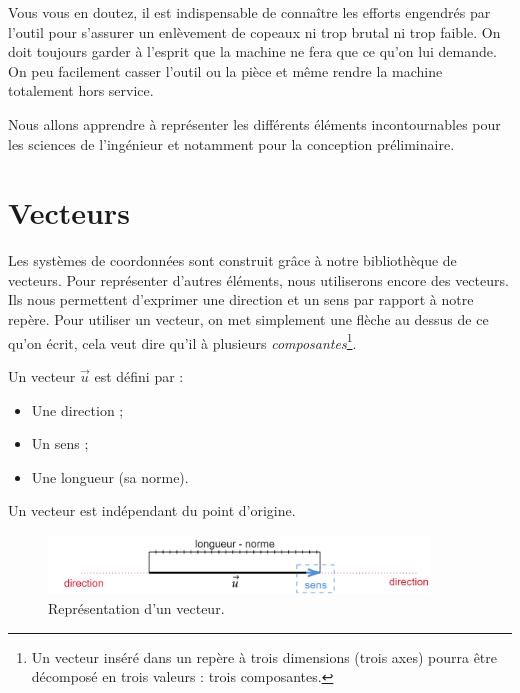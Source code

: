 \documentclass[
	11pt, %
	fleqn, %
	a4paper, %
]{LegrandOrangeBook}
\begin{document}
Vous vous en doutez, il est indispensable de connaître les efforts engendrés par l'outil pour s'assurer un enlèvement de copeaux ni trop brutal ni trop faible. On doit toujours garder à l'esprit que la machine ne fera que ce qu'on lui demande. On peu facilement casser l'outil ou la pièce et même rendre la machine totalement hors service.

Nous allons apprendre à représenter les différents éléments incontournables pour les sciences de l'ingénieur et notamment pour la conception préliminaire.







\section{Vecteurs}
Les systèmes de coordonnées sont construit grâce à notre bibliothèque de vecteurs. Pour représenter d'autres éléments, nous utiliserons encore des vecteurs. Ils nous permettent d'exprimer une direction et un sens par rapport à notre repère. Pour utiliser un vecteur, on met simplement une flèche au dessus de ce qu'on écrit, cela veut dire qu'il à plusieurs \textit{composantes}\footnote{Un vecteur inséré dans un repère à trois dimensions (trois axes) pourra être décomposé en trois valeurs : trois composantes.}.\\

\begin{definition}\label{Vecteurs}
    Un vecteur $\Vec{u}$ est défini par :
    \begin{itemize}
        \item Une direction ;
        \item Un sens ;
        \item Une longueur (sa norme).
    \end{itemize}
Un vecteur est indépendant du point d’origine.

\begin{figure}[H] %
	\centering %
	\includegraphics[width=0.9\textwidth]{Images/reel2.png} %
	\caption{Représentation d'un vecteur.}
	\label{vecteur} %
\end{figure}

\end{definition}
\end{document}
